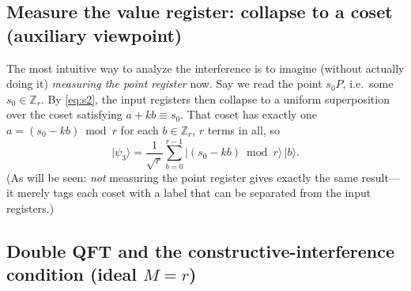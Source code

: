 \documentclass[11pt]{article}
\begin{document}
\subsection{Measure the value register: collapse to a coset (auxiliary viewpoint)}

The most intuitive way to analyze the interference is to imagine (without actually doing it) \emph{measuring the point register} now. Say we read the point $s_0P$, i.e.\ some
$s_0\in\mathbb{Z}_r$. By \eqref{eq:s2}, the input registers then collapse to a uniform superposition over the coset satisfying $a+kb\equiv s_0$. That coset has exactly one $a=(s_0-kb)\bmod r$
for each $b\in\mathbb{Z}_r$, $r$ terms in all, so
\begin{equation}
\lvert\psi_3\rangle=\frac{1}{\sqrt r}\sum_{b=0}^{r-1}\bigl\lvert (s_0-kb)\bmod r\bigr\rangle\,\lvert b\rangle .
\label{eq:s3}
\end{equation}
(As will be seen: \emph{not} measuring the point register gives exactly the same result---it merely tags each coset with a label that can be separated from the input registers.)

\subsection{Double QFT and the constructive-interference condition (ideal $M=r$)}
\label{ssec:ideal}
\end{document}
